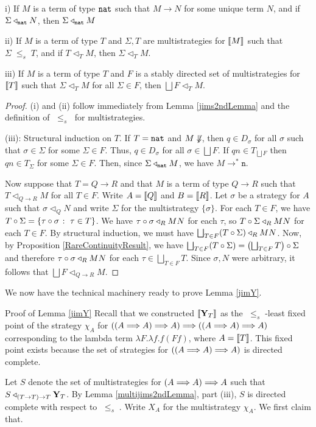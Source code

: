 \documentclass{entcs} \usepackage{prentcsmacro}
\newcommand{\stle}{{\;\le_s\;}}
\newcommand{\exlub}{\bigsqcup}
\newcommand{\opto}{\longrightarrow}
\newcommand{\n}{{\mathtt{n}}}
\newcommand{\0}{{\mathtt{0}}}
\newcommand{\plot}{\triangleleft}
\newcommand{\Tau}{T}
\newcommand{\Chi}{X}
\begin{document}
\begin{lemma}
  \label{multijims2ndLemma}
  i) If $M$ is a term of type ${\mathtt{nat}}$ such that $M\opto N$ for some unique term $N$, and if $\Sigma\plot_\nat N$, then $\Sigma\plot_\nat M$

  ii) If $M$ is a term of type $T$ and $\Sigma,\Tau$ are multistrategies for $\left\llbracket M\right\rrbracket$ such that $\Sigma\stle\Tau$, and if $\Tau\plot_TM$, then $\Sigma\plot_TM$.

  iii) If $M$ is a term of type $T$ and $F$ is a stably directed set of multistrategies for $\left\llbracket T\right\rrbracket$ such that $\Sigma\plot_TM$ for all $\Sigma\in F$, then $\exlub F\plot_TM$.
\end{lemma}
\begin{proof}
  (i) and (ii) follow immediately from Lemma \ref{jims2ndLemma} and the definition of $\stle$ for multistrategies.

  (iii): Structural induction on $T$.  If $T={\mathtt{nat}}$ and $M\not\Downarrow$, then $q\in D_\sigma$ for all $\sigma$ such that $\sigma\in\Sigma$ for some $\Sigma\in F$.  Thus, $q\in D_\sigma$ for all $\sigma\in\exlub F$.  If $qn\in T_{\exlub F}$ then $qn\in T_\Sigma$ for some $\Sigma\in F$.  Then, since $\Sigma\plot_\nat M$, we have $M\opto^*\n$.  

  Now suppose that $T=Q\to R$ and that $M$ is a term of type $Q\to R$ such that $\Tau\plot_{Q\to R}M$ for all $\Tau\in F$.  Write $A=\left\llbracket Q\right\rrbracket$ and $B=\left\llbracket R\right\rrbracket$.  Let $\sigma$ be a strategy for $A$ such that $\sigma\plot_QN$ and write $\Sigma$ for the multistrategy $\{\sigma\}$.  For each $\Tau\in F$, we have $\icomp\Tau\Sigma = \{\icomp\tau\sigma\suchthat\tau\in\Tau\}$.  We have $\icomp\tau\sigma\plot_RMN$ for each $\tau$, so $\icomp\Tau\Sigma\plot_RMN$ for each $\Tau\in F$.  By structural induction, we must have $\exlub_{\Tau\in F}(\icomp\Tau\Sigma)\plot_RMN$.  Now, by Proposition \ref{RareContinuityResult}, we have $\exlub_{\Tau\in F}(\icomp\Tau\Sigma)=\icomp{\left(\exlub_{\Tau\in F}\Tau\right)}\Sigma$ and therefore $\icomp\tau\sigma\plot_RMN$ for each $\tau\in\exlub_{\Tau\in F}\Tau$.  Since $\sigma, N$ were arbitrary, it follows that $\exlub F\plot_{Q\to R}M$.  
\end{proof}

We now have the technical machinery ready to prove Lemma \ref{jimY}.

\begin{proof*}{Proof of Lemma \ref{jimY}}
  Recall that we constructed $\left\llbracket\mathbf{Y}_T\right\rrbracket$ as the $\stle$-least fixed point of the strategy $\chi_A$ for $((A\Longrightarrow A)\Longrightarrow A)\Longrightarrow((A\Longrightarrow A)\Longrightarrow A)$ corresponding to the lambda term $\lambda F.\lambda f.f(F f)$, where $A=\left\llbracket T\right\rrbracket$.  This fixed point exists because the set of strategies for $((A\Longrightarrow A)\Longrightarrow A)$ is directed complete.  

  Let $S$ denote the set of multistrategies for $(A\Longrightarrow A)\Longrightarrow A$ such that $S\plot_{(T\to T)\to T}\Y_T$.  By Lemma \ref{multijims2ndLemma}, part (iii), $S$ is directed complete with respect to $\stle$.  Write $\Chi_A$ for the multistrategy $\chi_A$.  We first claim that.
\end{proof*}



\end{document}
